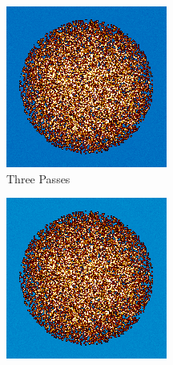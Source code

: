 \begin{figure}
\begin{subfigure}{0.25\textwidth}
  \includegraphics[width=0.95\linewidth]{figures/burn-20-bstep3}
  \caption{Three Passes}
  \label{fig:bstep3}
\end{subfigure}%
%
\begin{subfigure}{0.25\textwidth}
  \includegraphics[width=0.95\linewidth]{figures/burn-20-bstep4}

\end{subfigure}
\end{figure}
